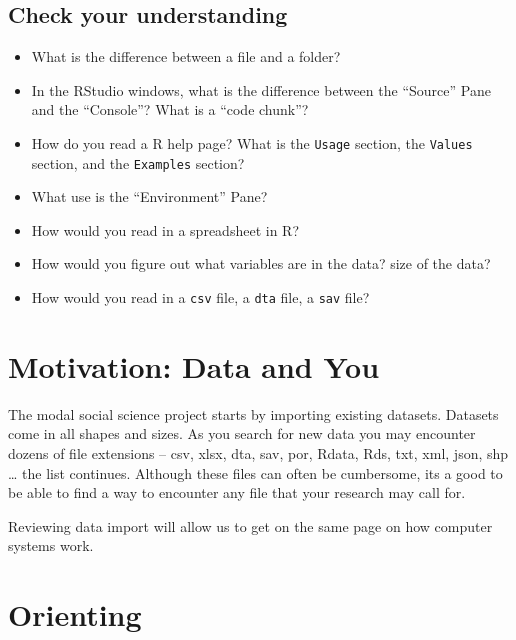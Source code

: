 \documentclass[]{book}
\providecommand{\tightlist}{%
  \setlength{\itemsep}{0pt}\setlength{\parskip}{0pt}}
\theoremstyle{definition}
\theoremstyle{definition}
\theoremstyle{definition}
\theoremstyle{remark}
\begin{document}
\subsection*{Check your understanding}\label{check-your-understanding}

\begin{itemize}
\tightlist
\item
  What is the difference between a file and a folder?
\item
  In the RStudio windows, what is the difference between the ``Source''
  Pane and the ``Console''? What is a ``code chunk''?
\item
  How do you read a R help page? What is the \texttt{Usage} section, the
  \texttt{Values} section, and the \texttt{Examples} section?
\item
  What use is the ``Environment'' Pane?
\item
  How would you read in a spreadsheet in R?
\item
  How would you figure out what variables are in the data? size of the
  data?
\item
  How would you read in a \texttt{csv} file, a \texttt{dta} file, a
  \texttt{sav} file?
\end{itemize}

\section{Motivation: Data and You}\label{motivation-data-and-you}

The modal social science project starts by importing existing datasets.
Datasets come in all shapes and sizes. As you search for new data you
may encounter dozens of file extensions -- csv, xlsx, dta, sav, por,
Rdata, Rds, txt, xml, json, shp \ldots{} the list continues. Although
these files can often be cumbersome, its a good to be able to find a way
to encounter any file that your research may call for.

Reviewing data import will allow us to get on the same page on how
computer systems work.

\section{Orienting}\label{orienting}
\end{document}
